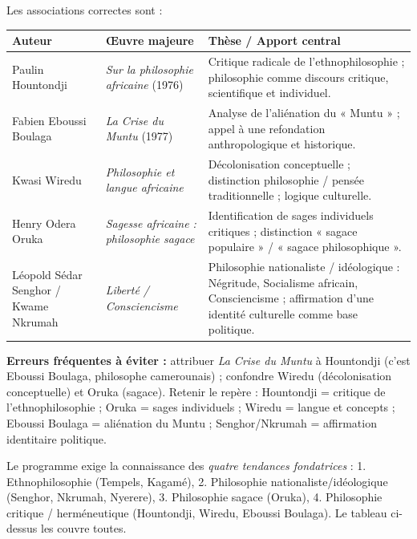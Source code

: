 \documentclass[11pt]{article}
\begin{document}
\begin{corrige}
Les associations correctes sont :
\begin{center}
\begin{tabularx}{\linewidth}{|X|X|X|}\hline
\rowcolor{popblueL}
\textbf{Auteur} & \textbf{Œuvre majeure} & \textbf{Thèse / Apport central} \\ \hline
Paulin Hountondji & \emph{Sur la philosophie africaine} (1976) & Critique radicale de l'ethnophilosophie ; philosophie comme discours critique, scientifique et individuel. \\ \hline
Fabien Eboussi Boulaga & \emph{La Crise du Muntu} (1977) & Analyse de l'aliénation du « Muntu » ; appel à une refondation anthropologique et historique. \\ \hline
Kwasi Wiredu & \emph{Philosophie et langue africaine} & Décolonisation conceptuelle ; distinction philosophie / pensée traditionnelle ; logique culturelle. \\ \hline
Henry Odera Oruka & \emph{Sagesse africaine : philosophie sagace} & Identification de sages individuels critiques ; distinction « sagace populaire » / « sagace philosophique ». \\ \hline
Léopold Sédar Senghor / Kwame Nkrumah & \emph{Liberté / Consciencisme} & Philosophie nationaliste / idéologique : Négritude, Socialisme africain, Consciencisme ; affirmation d'une identité culturelle comme base politique. \\ \hline
\end{tabularx}
\end{center}
\textbf{Erreurs fréquentes à éviter :} attribuer \emph{La Crise du Muntu} à Hountondji (c'est Eboussi Boulaga, philosophe camerounais) ; confondre Wiredu (décolonisation conceptuelle) et Oruka (sagace). Retenir le repère : Hountondji = critique de l'ethnophilosophie ; Oruka = sages individuels ; Wiredu = langue et concepts ; Eboussi Boulaga = aliénation du Muntu ; Senghor/Nkrumah = affirmation identitaire politique.
\end{corrige}

\begin{attention}
Le programme exige la connaissance des \emph{quatre tendances fondatrices} : 1. Ethnophilosophie (Tempels, Kagamé), 2. Philosophie nationaliste/idéologique (Senghor, Nkrumah, Nyerere), 3. Philosophie sagace (Oruka), 4. Philosophie critique / herméneutique (Hountondji, Wiredu, Eboussi Boulaga). Le tableau ci-dessus les couvre toutes.
\end{attention}
\end{document}
